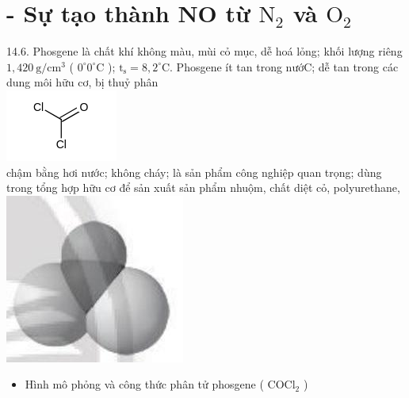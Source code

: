 \documentclass[10pt]{article}
\begin{document}
\section*{- Sự tạo thành NO từ $\mathrm{N}_{2}$ và $\mathrm{O}_{2}$}
14.6. Phosgene là chất khí không màu, mùi cỏ mục, dễ hoá lỏng; khối lượng riêng $1,420 \mathrm{~g} / \mathrm{cm}^{3}$ ( $0^{\circ} 0^{\circ} \mathrm{C}$ ); $\mathrm{t}_{\mathrm{s}}=8,2^{\circ} \mathrm{C}$. Phosgene ít tan trong nướC; dễ tan trong các dung môi hữu cơ, bị thuỷ phân\\
\includegraphics{smile-7112bf2f08ed966b886d2cd5c6982fa95f1d70ba}\\
chậm bằng hơi nước; không cháy; là sản phẩm công nghiệp quan trọng; dùng trong tổng hợp hữu cơ để sản xuất sản phẩm nhuộm, chất diệt cỏ, polyurethane,\\
\includegraphics[max width=\textwidth, center]{2025_10_23_883c4b146e2332109fcdg-52}

\begin{itemize}
  \item Hình mô phỏng và công thức phân tử phosgene ( $\mathrm{COCl}_{2}$ )
\end{itemize}
\end{document}
